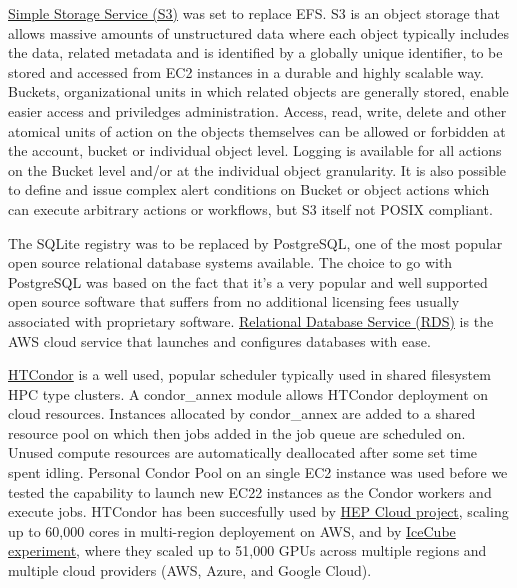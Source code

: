 \href{https://aws.amazon.com/s3/}{Simple Storage Service (S3)} was set to replace EFS. S3 is an object storage that allows massive amounts of unstructured data where each object typically includes the data, related metadata and is identified by a globally unique identifier, to be stored and accessed from EC2 instances in a durable and highly scalable way.\newline
Buckets, organizational units in which related objects are generally stored, enable easier access and priviledges administration. Access, read, write, delete and other atomical units of action on the objects themselves can be allowed or forbidden at the account, bucket or individual object level. Logging is available for all actions on the Bucket level and/or at the individual object granularity. It is also possible to define and issue complex alert conditions on Bucket or object actions which can execute arbitrary actions or workflows, but S3 itself not POSIX compliant. 

The SQLite registry was to be replaced by PostgreSQL, one of the most popular open source relational database systems available. The choice to go with PostgreSQL was based on the fact that it's a very popular and well supported open source software that suffers from no additional licensing fees usually associated with proprietary software. \href{https://aws.amazon.com/rds/}{Relational Database Service (RDS)} is the AWS cloud service that launches and configures databases with ease. 

\href{https://research.cs.wisc.edu/htcondor}{HTCondor} is a well used, popular scheduler typically used in shared filesystem HPC type clusters. A condor\_annex module allows HTCondor deployment on cloud resources. Instances allocated by condor\_annex are added to a shared resource pool on which then jobs added in the job queue are scheduled on. Unused compute resources are automatically deallocated after some set time spent idling. Personal Condor Pool on an single EC2 instance was used before we tested the capability to launch new EC22 instances as the Condor workers and execute jobs. HTCondor has been succesfully used by \href{https://aws.amazon.com/blogs/aws/experiment-that-discovered-the-higgs-boson-uses-aws-to-probe-nature}{HEP Cloud project}, scaling up to 60,000 cores in multi-region deployement on AWS, and by \href{https://www.linkedin.com/pulse/using-50k-gpus-across-multiple-clouds-icecube-science-igor-sfiligoi}{IceCube experiment}, where they scaled up to 51,000 GPUs across multiple regions and multiple cloud providers (AWS, Azure, and Google Cloud). 

